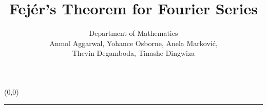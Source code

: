 \documentclass[a1,portrait]{a0poster}
\begin{document}
    \title{Fej\'er's Theorem for Fourier Series}

    \author{\LARGE{Department of Mathematics}\\ \large{Anmol Aggarwal, Yohance Osborne, An\dj ela Markovi\'c,} \\ \large{Thevin Degamboda, Tinashe Dingwiza }}

    \begin{textblock}{15}(0,0)
    \vspace*{-120mm}\hspace*{-50mm}\textcolor{black}{\rule{700mm}{93mm}}\\[-5mm]
    \vspace*{-33mm}\hspace*{-42mm}%
    \begin{minipage}{594mm} %
    \vspace{-8.0cm}
    \maketitle
    \pagestyle{empty}
    \thispagestyle{empty}
    \end{minipage}
    \end{textblock}
\end{document}
